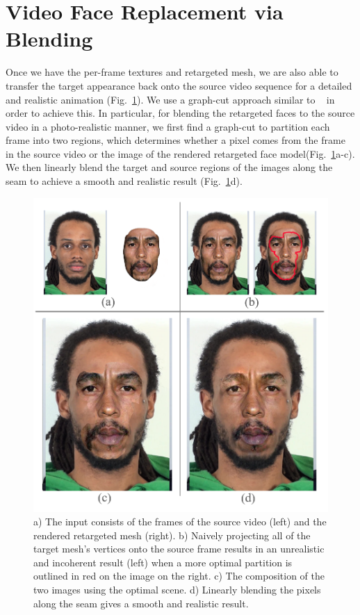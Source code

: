 

\section{Video Face Replacement via Blending}

Once we have the per-frame textures and retargeted mesh, we are also able to transfer the target appearance back onto the source video
sequence for a detailed and realistic animation (Fig.~\ref{fig:blend}). We use a graph-cut approach similar to ~\cite{replace} in order 
to achieve this.  In particular, for blending the retargeted faces to the source video in a photo-realistic manner,
we first find a graph-cut to partition each frame into two regions, which determines whether 
a pixel comes from the frame in the source video or the image of the rendered retargeted face model(Fig.~\ref{fig:blend}a-c). 
We then linearly blend the target and source regions of the images along the seam to achieve a smooth and realistic result (Fig.~\ref{fig:blend}d).
 
\begin{figure}[t]
  \centering
  \includegraphics[width=0.6\linewidth]{figures/blending/blending_new_tidus.png}
  \caption{a) The input consists of the frames of the source video (left) and the rendered retargeted mesh (right). b) Naively projecting all of the target mesh's vertices onto the source frame results in an unrealistic and incoherent result (left) when a more optimal partition is outlined in red on the image on the right. 
	c) The composition of the two images using the optimal scene.
	d) Linearly blending the pixels along the seam gives a smooth and realistic result.}
	\label{fig:blend}
  \vspace{-0.15in}
\end{figure}



